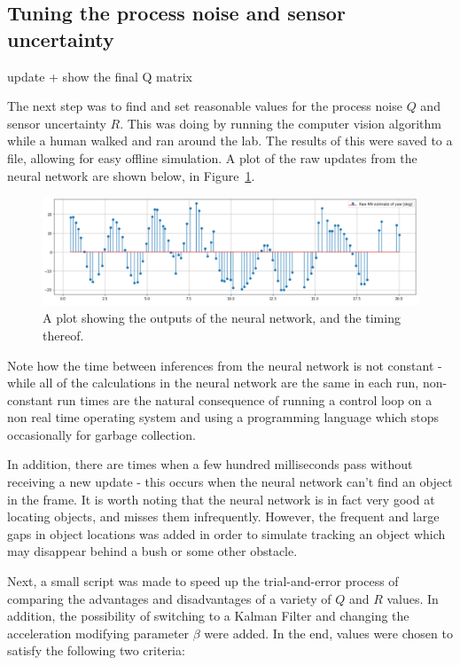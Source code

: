 \subsection{Tuning the process noise and sensor uncertainty}
{\color{red} update + show the final Q matrix}

The next step was to find and set reasonable values for the process noise $Q$ and sensor uncertainty $R$. This was doing by running the computer vision algorithm while a human walked and ran around the lab. The results of this were saved to a file, allowing for easy offline simulation. A plot of the raw updates from the neural network are shown below, in Figure~\ref{fig:raw_nn_results}.

\begin{figure}[h!]
  \centering
  \includegraphics[width=\textwidth]{methodology/raw_nn_results}
  \caption{\label{fig:raw_nn_results} A plot showing the outputs of the neural network, and the timing thereof.}
\end{figure}

Note how the time between inferences from the neural network is not constant - while all of the calculations in the neural network are the same in each run, non-constant run times are the natural consequence of running a control loop on a non real time operating system and using a programming language which stops occasionally for garbage collection.

In addition, there are times when a few hundred milliseconds pass without receiving a new update - this occurs when the neural network can't find an object in the frame. It is worth noting that the neural network is in fact very good at locating objects, and misses them infrequently. However, the frequent and large gaps in object locations was added in order to simulate tracking an object which may disappear behind a bush or some other obstacle.

Next, a small script was made to speed up the trial-and-error process of comparing the advantages and disadvantages of a variety of $Q$ and $R$ values. In addition, the possibility of switching to a Kalman Filter and changing the acceleration modifying parameter $\beta$ were added. In the end, values were chosen to satisfy the following two criteria:

